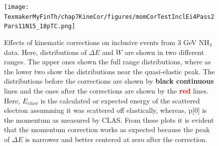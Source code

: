 \begin{figure}[htpb] %
\centering
 \leavevmode \texttt{[image: TexmakerMyFinTh/chap7KineCor/figures/momCorTestInclEi4Pass2Pars11N15\_18pTC.png]} 
\caption[Effects of corrections on inclusive events from 3 GeV NH$_3$ data]{Effects of kinematic corrections on inclusive events 
from 3 GeV NH$_3$ data. Here, distributions of $\Delta E$ and $W$ are shown in two different ranges. The upper ones shown the full 
range distributions, where as the lower two show the distributions near the quasi-elastic peak. The distributions before the 
corrections are shown by {\bf black continuous} lines and the ones after the corrections are shown by the \textcolor{red}{{\bf red}} 
lines. Here, $E_{elast}$ is the calculated or expected energy of the scattered electron assumming it was scattered off
elastically, whereas, p[0] is the momentum as measured by CLAS. From these plots it is evident that the momentum correction works
as expected because the peak of $\Delta E$ is narrower and better centered at zero after the correction.}
\label{fig:epElastic}
\end{figure}
